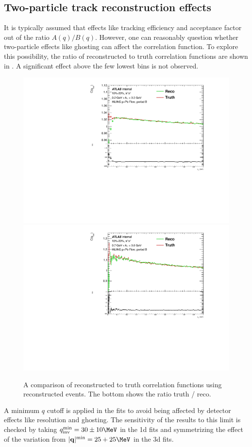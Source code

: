 \subsection{Two-particle track reconstruction effects}
It is typically assumed that effects like tracking efficiency and acceptance factor out of the ratio $A(q) / B(q)$.
However, one can reasonably question whether two-particle effects like ghosting can affect the correlation function.
To explore this possibility, the ratio of reconstructed to truth correlation functions are shown in .
A significant effect above the few lowest \qinv bins is not observed.

\begin{figure}[t]
\begin{minipage}[t]{1.0\textwidth}
\centering
\includegraphics[width=.49\linewidth]{Cqinv_hijing_reco_vs_truth_cent3_e3_kt1.pdf}
\includegraphics[width=.49\linewidth]{Cqinv_hijing_reco_vs_truth_cent3_e3_kt6.pdf}
\end{minipage}
\caption{A comparison of reconstructed to truth correlation functions using reconstructed \Hijing events.
The bottom shows the ratio truth / reco.}
\label{fig:2pc_effects}
\end{figure}

A minimum $q$ cutoff is applied in the fits to avoid being affected by detector effects like resolution and ghosting.
The sensitivity of the results to this limit is checked by taking $\qinv^\textrm{min} = 30 \pm 10 \MeV$ in the 1d fits and symmetrizing the effect of the variation from $|\mathbf{q}|^\textrm{min} = 25 + 25 \MeV$ in the 3d fits.

